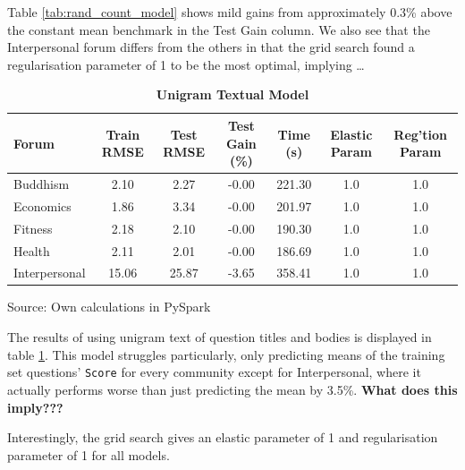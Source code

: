 \documentclass[11pt,preprint, authoryear]{article}
\numberwithin{equation}{section}
\begin{document}
\normalsize

Table \ref{tab:rand_count_model} shows mild gains from approximately
0.3\% above the constant mean benchmark in the Test Gain column. We also
see that the Interpersonal forum differs from the others in that the
grid search found a regularisation parameter of 1 to be the most
optimal, implying \ldots{}

\footnotesize

\begin{longtable}[htbp] {@{} lcccccc @{}} 
\caption{\textbf{Unigram Textual Model}} 
\label{tab:rand_token_model} \\
\toprule
\textbf{Forum} &  \textbf{Train RMSE} &  \textbf{Test RMSE} &  \textbf{Test Gain (\%)} &  \textbf{Time (s)} & \textbf{Elastic Param} &  \textbf{Reg'tion Param} \\
\midrule
Buddhism      &              2.10 &           2.27 &           -0.00 &          221.30 &               1.0 &               1.0 \\
Economics     &              1.86 &           3.34 &           -0.00 &          201.97 &               1.0 &               1.0 \\
Fitness       &              2.18 &           2.10 &           -0.00 &          190.30 &               1.0 &               1.0 \\
Health        &              2.11 &           2.01 &           -0.00 &          186.69 &               1.0 &               1.0 \\
Interpersonal &             15.06 &          25.87 &           -3.65 &          358.41 &               1.0 &               1.0 \\
\bottomrule
\end{longtable}\begin{center} Source: Own calculations in PySpark\end{center}

\normalsize

The results of using unigram text of question titles and bodies is
displayed in table \ref{tab:rand_token_model}. This model struggles
particularly, only predicting means of the training set questions'
\texttt{Score} for every community except for Interpersonal, where it
actually performs worse than just predicting the mean by 3.5\%.
\textbf{What does this imply???}

Interestingly, the grid search gives an elastic parameter of 1 and
regularisation parameter of 1 for all models.

\footnotesize
\end{document}
